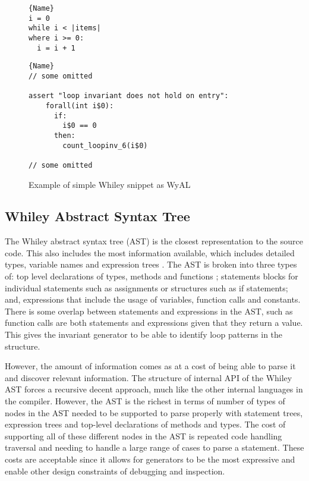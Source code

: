 \begin{figure}
\noindent\begin{minipage}{.45\textwidth}
\begin{lstlisting}[caption={Whiley Code},frame=tlrb,numbers=none]{Name}
i = 0
while i < |items|
where i >= 0:
  i = i + 1
\end{lstlisting}
\end{minipage}\hfill
\begin{minipage}{.45\textwidth}
\begin{lstlisting}[caption={WyAL Code},frame=tlrb,numbers=none,breaklines=true]{Name}
// some omitted
      
assert "loop invariant does not hold on entry":
    forall(int i$0):
      if:
        i$0 == 0
      then:
        count_loopinv_6(i$0)

// some omitted
\end{lstlisting}
\end{minipage}
\caption{Example of simple Whiley snippet as WyAL}
\label{lst:design-wyal}
\end{figure}

\subsection{Whiley Abstract Syntax Tree}

The Whiley abstract syntax tree (AST) is the closest representation to
the source code.
This also includes the most information available, which includes detailed
types, variable names and expression trees \cite{whiley-origin}.
The AST is broken into three types of: top level declarations of types,
methods and functions ; statements blocks for individual statements
such as assignments or structures such as if statements; and, expressions
that include the usage of variables, function calls and constants.
There is some overlap between statements and expressions in the AST,
such as function calls are both statements and expressions given that they
return a value.
This gives the invariant generator to be able to identify loop patterns in the
structure.

However, the amount of information comes as at a cost of being able to parse
it and discover relevant information.
The structure of internal API of the Whiley AST forces a recursive decent
approach, much like the other internal languages in the compiler.
However, the AST is the richest in terms of number of types of nodes
in the AST needed to be supported to parse properly with
statement trees, expression trees and top-level declarations of methods and
types.
The cost of supporting all of these different nodes in the AST is
repeated code handling traversal and needing to handle a large range
of cases to parse a statement.
These costs are acceptable since it allows for generators to be
the most expressive and enable other design constraints of
debugging and inspection.

